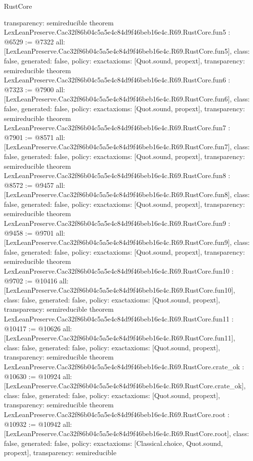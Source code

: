 \begin{lexlean}{RustCore}
\begin{coremodule}
{  transparency: semireducible
}
theorem LexLeanPreserve.Cac32f86b04c5a5e4c84d9f46beb16e4c.R69.RustCore.fun5 : @6529 := @7322 {
  all: [LexLeanPreserve.Cac32f86b04c5a5e4c84d9f46beb16e4c.R69.RustCore.fun5],
  class: false,
  generated: false,
  policy: exact{axioms: [Quot.sound, propext]},
  transparency: semireducible
}
theorem LexLeanPreserve.Cac32f86b04c5a5e4c84d9f46beb16e4c.R69.RustCore.fun6 : @7323 := @7900 {
  all: [LexLeanPreserve.Cac32f86b04c5a5e4c84d9f46beb16e4c.R69.RustCore.fun6],
  class: false,
  generated: false,
  policy: exact{axioms: [Quot.sound, propext]},
  transparency: semireducible
}
theorem LexLeanPreserve.Cac32f86b04c5a5e4c84d9f46beb16e4c.R69.RustCore.fun7 : @7901 := @8571 {
  all: [LexLeanPreserve.Cac32f86b04c5a5e4c84d9f46beb16e4c.R69.RustCore.fun7],
  class: false,
  generated: false,
  policy: exact{axioms: [Quot.sound, propext]},
  transparency: semireducible
}
theorem LexLeanPreserve.Cac32f86b04c5a5e4c84d9f46beb16e4c.R69.RustCore.fun8 : @8572 := @9457 {
  all: [LexLeanPreserve.Cac32f86b04c5a5e4c84d9f46beb16e4c.R69.RustCore.fun8],
  class: false,
  generated: false,
  policy: exact{axioms: [Quot.sound, propext]},
  transparency: semireducible
}
theorem LexLeanPreserve.Cac32f86b04c5a5e4c84d9f46beb16e4c.R69.RustCore.fun9 : @9458 := @9701 {
  all: [LexLeanPreserve.Cac32f86b04c5a5e4c84d9f46beb16e4c.R69.RustCore.fun9],
  class: false,
  generated: false,
  policy: exact{axioms: [Quot.sound, propext]},
  transparency: semireducible
}
theorem LexLeanPreserve.Cac32f86b04c5a5e4c84d9f46beb16e4c.R69.RustCore.fun10 : @9702 := @10416 {
  all: [LexLeanPreserve.Cac32f86b04c5a5e4c84d9f46beb16e4c.R69.RustCore.fun10],
  class: false,
  generated: false,
  policy: exact{axioms: [Quot.sound, propext]},
  transparency: semireducible
}
theorem LexLeanPreserve.Cac32f86b04c5a5e4c84d9f46beb16e4c.R69.RustCore.fun11 : @10417 := @10626 {
  all: [LexLeanPreserve.Cac32f86b04c5a5e4c84d9f46beb16e4c.R69.RustCore.fun11],
  class: false,
  generated: false,
  policy: exact{axioms: [Quot.sound, propext]},
  transparency: semireducible
}
theorem LexLeanPreserve.Cac32f86b04c5a5e4c84d9f46beb16e4c.R69.RustCore.crate_ok : @10630 := @10924 {
  all: [LexLeanPreserve.Cac32f86b04c5a5e4c84d9f46beb16e4c.R69.RustCore.crate_ok],
  class: false,
  generated: false,
  policy: exact{axioms: [Quot.sound, propext]},
  transparency: semireducible
}
theorem LexLeanPreserve.Cac32f86b04c5a5e4c84d9f46beb16e4c.R69.RustCore.root : @10932 := @10942 {
  all: [LexLeanPreserve.Cac32f86b04c5a5e4c84d9f46beb16e4c.R69.RustCore.root],
  class: false,
  generated: false,
  policy: exact{axioms: [Classical.choice, Quot.sound, propext]},
  transparency: semireducible
}


\end{coremodule}
\end{lexlean}
